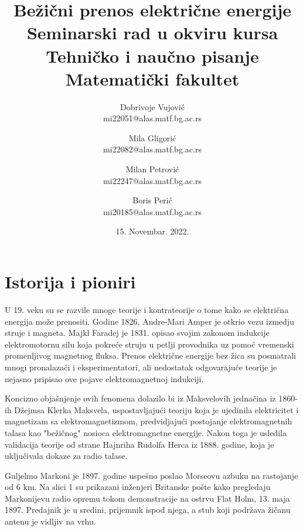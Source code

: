 \documentclass[a4paper]{article}
\begin{document}
	\title{Bežični prenos električne energije\\ \small{Seminarski rad u okviru kursa\\Tehničko i naučno pisanje\\ Matematički fakultet}}
	
	\author{Dobrivoje Vujović \\mi22051@alas.matf.bg.ac.rs 
			\and Mila Gligorić \\mi22082@alas.matf.bg.ac.rs
			\and Milan Petrović \\mi22247@alas.matf.bg.ac.rs
			\and Boris Perić\\mi20185@alas.matf.bg.ac.rs}

	\date{15. Novembar. 2022.}
	\maketitle

\tableofcontents
\newpage

\section{Istorija i pioniri}

U 19. veku su se razvile mnoge teorije i kontrateorije o tome kako se električna energija može prenositi. Godine 1826, Andre-Mari Amper je otkrio vezu izmedju struje i magneta. Majkl Faradej je 1831. opisao svojim zakonom indukcije elektromotornu silu koja pokreće struju u petlji provodnika uz pomoć vremenski promenljivog magnetnog fluksa. Prenos električne energije bez žica su posmatrali mnogi pronalazači i eksperimentatori, ali nedostatak odgovarajuće teorije je nejasno pripisao ove pojave elektromagnetnoj indukciji.\cite{enwiki:1118144890}

Koncizno objašnjenje ovih fenomena dolazilo bi iz Maksvelovih jednačina iz 1860-ih Džejmsa Klerka Maksvela, uspostavljajući teoriju koja je ujedinila elektricitet i magnetizam sa elektromagnetizmom, predvidjajući postojanje elektromagnetnih talasa kao "bežičnog" nosioca elektromagnetne energije.
Nakon toga je usledila validacija teorije od strane Hajnriha Rudolfa Herca iz 1888. godine, koja je uključivala dokaze za radio talase.

Guljelmo Markoni je 1897. godine uspešno poslao Morseovu azbuku na rastojanje od 6 km.
Na slici 1 su prikazani inženjeri Britanske pošte kako pregledaju Markonijevu radio opremu tokom demonstracije na ostrvu Flat Holm, 13. maja 1897. Predajnik je u sredini, prijemnik ispod njega, a stub koji podržava žičanu antenu je vidljiv na vrhu.
\end{document}
